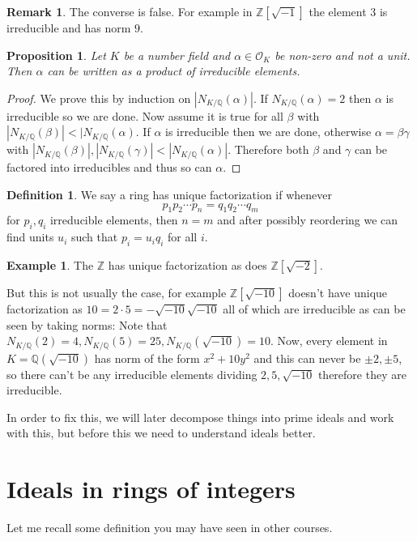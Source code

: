 \documentclass[11pt,a4paper]{report}
\theoremstyle{plain}
\newtheorem{prop}[subsection]{Proposition}
\theoremstyle{definition}
\newtheorem{defn}[subsection]{Definition}
\newtheorem{exmp}[subsection]{Example}
\theoremstyle{definition}
\newtheorem{rmrk}[subsection]{Remark}
\newcommand{\ZZ}{\mathbb{Z}}
\def\QQ{\mathbb{Q}}
\def \Nm {N_{K/\QQ}}
\def \a{\alpha}
\def \OO {\mathcal{O}}
\begin{document}
\begin{rmrk}
The converse is false. For example in $\ZZ[\sqrt{-1}]$ the element $3$ is irreducible and has norm $9$.
\end{rmrk}

\begin{prop}
Let $K$ be a number field and $\a \in \OO_K$ be non-zero and not a unit. Then $\a$ can be written as a product of irreducible elements.
\end{prop}

\begin{proof}
We prove this by induction on $|\Nm(\a)|$. If $\Nm(\a)=2$ then $\a$ is irreducible so we are done. Now assume it is true for all $\beta$ with $|\Nm(\beta)|< |\Nm(\a)$. If $\a$ is irreducible then we are done, otherwise $\a=\beta \gamma$ with $|\Nm(\beta)|, |\Nm(\gamma)|< |\Nm(\a)|$. Therefore both $\beta$ and $\gamma$ can be factored into irreducibles and thus so can $\a$.
\end{proof}

\begin{defn}
We say a ring has unique factorization if whenever \[p_1p_2\cdots p_n=q_1q_2\cdots q_m\] for $p_i,q_i$ irreducible elements, then $n=m$ and after possibly reordering we can find units $u_i$ such that $p_i=u_iq_i$ for all $i$.
\end{defn}

\begin{exmp}
The $\ZZ$ has unique factorization as does $\ZZ[\sqrt{-2}]$. 

But this is not usually the case, for example $\ZZ[\sqrt{-10}]$ doesn't have unique factorization as $10=2 \cdot 5= -\sqrt{-10}\sqrt{-10}$ all of which are irreducible as can be seen by taking norms: Note that $\Nm(2)=4,\Nm(5)=25, \Nm(\sqrt{-10})=10$. Now, every element in $K=\QQ(\sqrt{-10})$ has norm of the form $x^2+10y^2$ and this can never be $\pm 2, \pm 5$, so there can't be any irreducible elements dividing $2,5,\sqrt{-10}$ therefore they are irreducible.
\end{exmp}

In order to fix this, we will later decompose things into prime ideals and work with this, but before this we need to understand ideals better.


\section{Ideals in rings of integers}


Let me recall some definition you may have seen in other courses.
\end{document}
